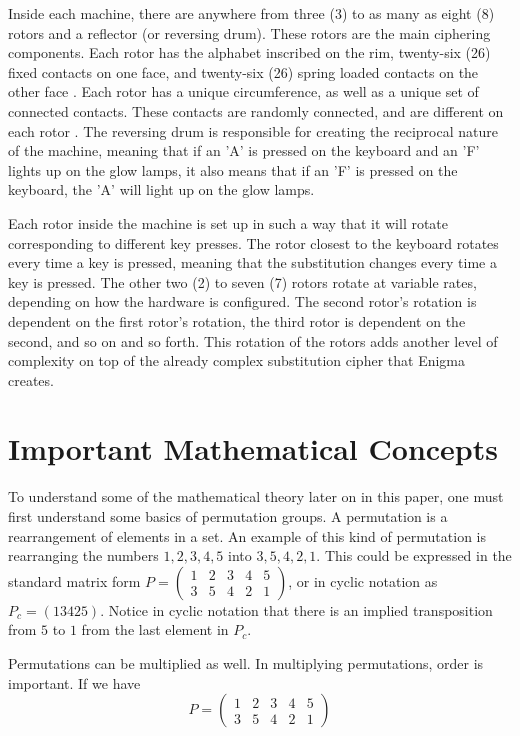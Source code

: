 Inside each machine, there are anywhere from three (3) to as many as eight (8) rotors and a reflector (or reversing drum). These rotors are the main ciphering components. Each rotor has the alphabet inscribed on the rim, twenty-six (26) fixed contacts on one face, and twenty-six (26) spring loaded contacts on the other face \cite{wk85}. Each rotor has a unique circumference, as well as a unique set of connected contacts. These contacts are randomly connected, and are different on each rotor \cite{bw05}. The reversing drum is responsible for creating the reciprocal nature of the machine, meaning that if an 'A' is pressed on the keyboard and an 'F' lights up on the glow lamps, it also means that if an 'F' is pressed on the keyboard, the 'A' will light up on the glow lamps.

Each rotor inside the machine is set up in such a way that it will rotate corresponding to different key presses. The rotor closest to the keyboard rotates every time a key is pressed, meaning that the substitution changes every time a key is pressed. The other two (2) to seven (7) rotors rotate at variable rates, depending on how the hardware is configured. The second rotor's rotation is dependent on the first rotor's rotation, the third rotor is dependent on the second, and so on and so forth. This rotation of the rotors adds another level of complexity on top of the already complex substitution cipher that Enigma creates.

\section{Important Mathematical Concepts}

To understand some of the mathematical theory later on in this paper, one must first understand some basics of permutation groups. A permutation is a rearrangement of elements in a set. An example of this kind of permutation is rearranging the numbers ${1,2,3,4,5}$ into ${3,5,4,2,1}$. This could be expressed in the standard matrix form
$P = \begin{pmatrix}
    1 & 2 & 3 & 4 & 5 \\
    3 & 5 & 4 & 2 & 1
  \end{pmatrix}$, or in cyclic notation as $P_c = (1 3 4 2 5)$. Notice in cyclic notation that there is an implied transposition from $5$ to $1$ from the last element in $P_c$.

Permutations can be multiplied as well. In multiplying permutations, order is important. If we have
$$P = \begin{pmatrix}
    1 & 2 & 3 & 4 & 5 \\
    3 & 5 & 4 & 2 & 1
  \end{pmatrix}$$

